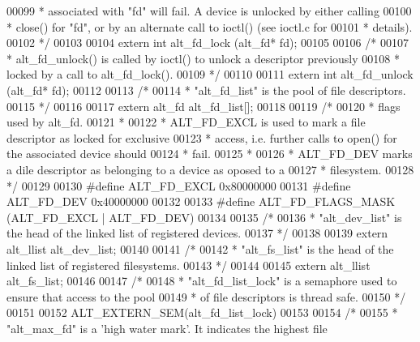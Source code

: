 \begin{DoxyCode}
00099 \textcolor{comment}{ * associated with "fd" will fail. A device is unlocked by either calling }
00100 \textcolor{comment}{ * close() for "fd", or by an alternate call to ioctl() (see ioctl.c for }
00101 \textcolor{comment}{ * details).}
00102 \textcolor{comment}{ */}
00103 
00104 \textcolor{keyword}{extern} \textcolor{keywordtype}{int} alt_fd_lock (alt_fd* fd);
00105 
00106 \textcolor{comment}{/*}
00107 \textcolor{comment}{ * alt\_fd\_unlock() is called by ioctl() to unlock a descriptor previously }
00108 \textcolor{comment}{ * locked by a call to alt\_fd\_lock().}
00109 \textcolor{comment}{ */}
00110 
00111 \textcolor{keyword}{extern} \textcolor{keywordtype}{int} alt_fd_unlock (alt_fd* fd);
00112 
00113 \textcolor{comment}{/*}
00114 \textcolor{comment}{ * "alt\_fd\_list" is the pool of file descriptors.}
00115 \textcolor{comment}{ */}
00116 
00117 \textcolor{keyword}{extern} alt_fd alt_fd_list[];
00118 
00119 \textcolor{comment}{/*}
00120 \textcolor{comment}{ * flags used by alt\_fd. }
00121 \textcolor{comment}{ *}
00122 \textcolor{comment}{ * ALT\_FD\_EXCL is used to mark a file descriptor as locked for exclusive}
00123 \textcolor{comment}{ * access, i.e. further calls to open() for the associated device should}
00124 \textcolor{comment}{ * fail.}
00125 \textcolor{comment}{ *}
00126 \textcolor{comment}{ * ALT\_FD\_DEV marks a dile descriptor as belonging to a device as oposed to a}
00127 \textcolor{comment}{ * filesystem. }
00128 \textcolor{comment}{ */}
00129 
00130 \textcolor{preprocessor}{#define ALT\_FD\_EXCL 0x80000000}
00131 \textcolor{preprocessor}{#define ALT\_FD\_DEV  0x40000000}
00132 
00133 \textcolor{preprocessor}{#define ALT\_FD\_FLAGS\_MASK (ALT\_FD\_EXCL | ALT\_FD\_DEV)}
00134 
00135 \textcolor{comment}{/*}
00136 \textcolor{comment}{ * "alt\_dev\_list" is the head of the linked list of registered devices.}
00137 \textcolor{comment}{ */}
00138 
00139 \textcolor{keyword}{extern} alt_llist alt_dev_list;
00140 
00141 \textcolor{comment}{/*}
00142 \textcolor{comment}{ * "alt\_fs\_list" is the head of the linked list of registered filesystems.}
00143 \textcolor{comment}{ */}
00144 
00145 \textcolor{keyword}{extern} alt_llist alt_fs_list;
00146 
00147 \textcolor{comment}{/*}
00148 \textcolor{comment}{ * "alt\_fd\_list\_lock" is a semaphore used to ensure that access to the pool}
00149 \textcolor{comment}{ * of file descriptors is thread safe.}
00150 \textcolor{comment}{ */}
00151 
00152 ALT_EXTERN_SEM(alt\_fd\_list\_lock)
00153 
00154 \textcolor{comment}{/*}
00155 \textcolor{comment}{ * "alt\_max\_fd" is a 'high water mark'. It indicates the highest file }

\end{DoxyCode}
